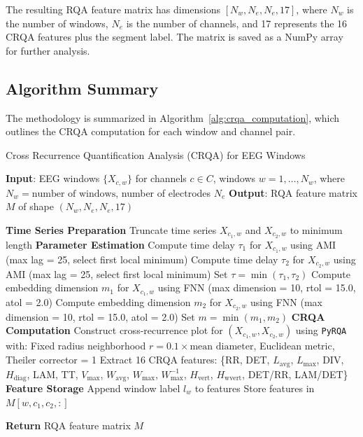 \documentclass{article}
\begin{document}
				The resulting RQA feature matrix has dimensions \([N_w, N_e, N_e, 17]\), where \(N_w\) is the number of windows, \(N_e\) is the number of channels, and 17 represents the 16 CRQA features plus the segment label. The matrix is saved as a NumPy array for further analysis.

				\subsection{Algorithm Summary}
				\label{subsec:algorithm}

				The methodology is summarized in Algorithm~\ref{alg:crqa_computation}, which outlines the CRQA computation for each window and channel pair.

				\begin{algorithm}
				\caption{Cross Recurrence Quantification Analysis (CRQA) for EEG Windows}
				\label{alg:crqa_computation}
				\begin{algorithmic}[1]
				\State \textbf{Input}: EEG windows \( \{X_{c,w}\} \) for channels \( c \in C \), windows \( w = 1, \dots, N_w \), where \( N_w = \text{number of windows} \), number of electrodes \( N_e \)
				\State \textbf{Output}: RQA feature matrix \( M \) of shape \( (N_w, N_e, N_e, 17) \)

					\State \textbf{Time Series Preparation}
					\State Truncate time series \( X_{c_1,w} \) and \( X_{c_2,w} \) to minimum length
					\State \textbf{Parameter Estimation}
					\State Compute time delay \( \tau_1 \) for \( X_{c_1,w} \) using AMI (max lag = 25, select first local minimum)
					\State Compute time delay \( \tau_2 \) for \( X_{c_2,w} \) using AMI (max lag = 25, select first local minimum)
					\State Set \( \tau = \min(\tau_1, \tau_2) \)
					\State Compute embedding dimension \( m_1 \) for \( X_{c_1,w} \) using FNN (max dimension = 10, rtol = 15.0, atol = 2.0)
					\State Compute embedding dimension \( m_2 \) for \( X_{c_2,w} \) using FNN (max dimension = 10, rtol = 15.0, atol = 2.0)
					\State Set \( m = \min(m_1, m_2) \)
					\State \textbf{CRQA Computation}
					\State Construct cross-recurrence plot for \( (X_{c_1,w}, X_{c_2,w}) \) using \texttt{PyRQA} with:
					\State \quad Fixed radius neighborhood \( r = 0.1 \times \text{mean diameter} \), Euclidean metric, Theiler corrector = 1
					\State Extract 16 CRQA features: \{RR, DET, \( L_{\text{avg}} \), \( L_{\text{max}} \), DIV, \( H_{\text{diag}} \), LAM, TT, \( V_{\text{max}} \), \( W_{\text{avg}} \), \( W_{\text{max}} \), \( W_{\text{max}}^{-1} \), \( H_{\text{vert}} \), \( H_{\text{wvert}} \), DET/RR, LAM/DET\}
					\State \textbf{Feature Storage}
					\State Append window label \( l_w \) to features
					\State Store features in \( M[w, c_1, c_2, :] \)
				    \EndFor
				\EndFor

				\State \textbf{Return} RQA feature matrix \( M \)
				\end{algorithmic}
				\end{algorithm}
\end{document}
